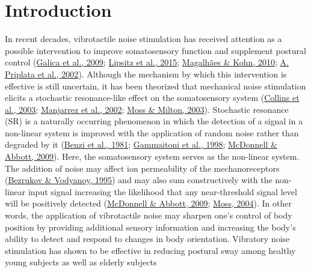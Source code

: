 \documentclass[]{cik}%
\begin{document}
\newpage\ifdefined\Shaded\renewenvironment{Shaded}{\begin{tcolorbox}[enhanced, frame hidden, borderline west={3pt}{0pt}{shadecolor}, breakable, sharp corners, boxrule=0pt, interior hidden]}{\end{tcolorbox}}\fi

\hypertarget{introduction}{%
\section{Introduction}\label{introduction}}

In recent decades, vibrotactile noise stimulation has received attention
as a possible intervention to improve somatosensory function and
supplement postural control (\protect\hyperlink{ref-Galica2009}{Galica
et al., 2009}; \protect\hyperlink{ref-Lipsitz2015}{Lipsitz et al.,
2015}; \protect\hyperlink{ref-magalhuxe3es2011}{Magalhães \& Kohn,
2010}; \protect\hyperlink{ref-Priplata2002}{A. Priplata et al., 2002}).
Although the mechanism by which this intervention is effective is still
uncertain, it has been theorized that mechanical noise stimulation
elicits a stochastic resonance-like effect on the somatosensory system
(\protect\hyperlink{ref-Collins2003}{Collins et al., 2003};
\protect\hyperlink{ref-Manjarrez2002}{Manjarrez et al., 2002};
\protect\hyperlink{ref-Moss2003}{Moss \& Milton, 2003}). Stochastic
resonance (SR) is a naturally occurring phenomenon in which the
detection of a signal in a non-linear system is improved with the
application of random noise rather than degraded by it
(\protect\hyperlink{ref-benzi1981}{Benzi et al., 1981};
\protect\hyperlink{ref-gammaitoni1998}{Gammaitoni et al., 1998};
\protect\hyperlink{ref-McDonnell2009}{McDonnell \& Abbott, 2009}). Here,
the somatosensory system serves as the non-linear system. The addition
of noise may affect ion permeability of the mechanoreceptors
(\protect\hyperlink{ref-Bezrukov1995}{Bezrukov \& Vodyanoy, 1995}) and
may also sum constructively with the non-linear input signal increasing
the likelihood that any near-threshold signal level will be positively
detected (\protect\hyperlink{ref-McDonnell2009}{McDonnell \& Abbott,
2009}; \protect\hyperlink{ref-Moss2004}{Moss, 2004}). In other words,
the application of vibrotactile noise may sharpen one's control of body
position by providing additional sensory information and increasing the
body's ability to detect and respond to changes in body orientation.
Vibratory noise stimulation has shown to be effective in reducing
postural sway among healthy young subjects as well as elderly subjects
\end{document}
